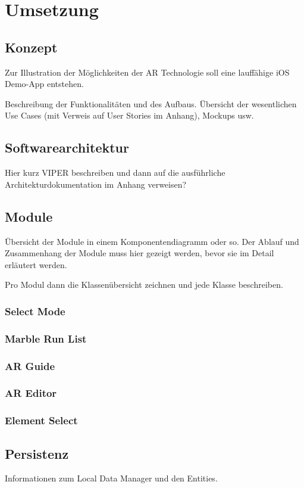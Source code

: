 \section{Umsetzung}


\subsection{Konzept}

Zur Illustration der Möglichkeiten der AR Technologie soll eine lauffähige iOS Demo-App entstehen.

Beschreibung der Funktionalitäten und des Aufbaus. Übersicht der wesentlichen Use Cases (mit Verweis auf User Stories im Anhang), Mockups usw.

\subsection{Softwarearchitektur}

Hier kurz VIPER beschreiben und dann auf die ausführliche Architekturdokumentation im Anhang verweisen?

\subsection{Module}

Übersicht der Module in einem Komponentendiagramm oder so.
Der Ablauf und Zusammenhang der Module muss hier gezeigt werden, bevor sie im Detail erläutert werden.

Pro Modul dann die Klassenübersicht zeichnen und jede Klasse beschreiben.

\subsubsection{Select Mode}

\subsubsection{Marble Run List}

\subsubsection{AR Guide}

\subsubsection{AR Editor}

\subsubsection{Element Select}


\subsection{Persistenz}

Informationen zum Local Data Manager und den Entities.
